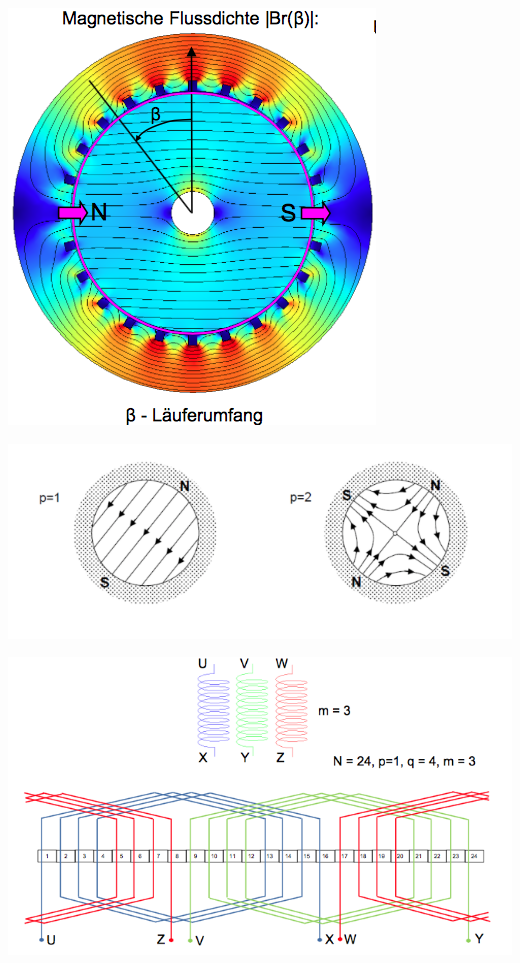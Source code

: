 \begin{minipage}{0.5 \linewidth}
\centering
\includegraphics[width = 0.5 \linewidth]{./Pics/VL89/Grundbegriff2}
\end{minipage}
\begin{minipage}{0.5 \linewidth}
\includegraphics[width = \linewidth]{./Pics/VL89/Polpaar}
\end{minipage}

\begin{minipage}{0.5 \linewidth}
\includegraphics[width = \linewidth]{./Pics/VL89/Wicklungsschema}
\end{minipage}

